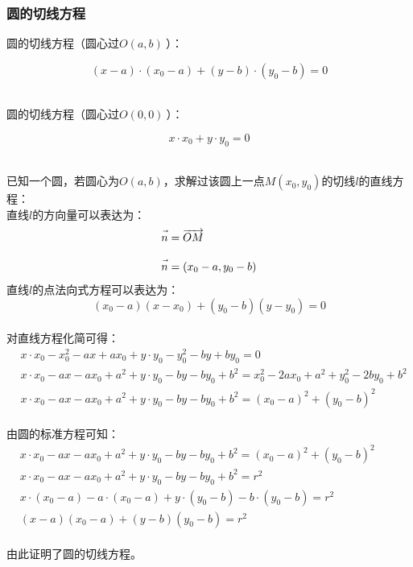 \documentclass[UTF8]{ctexart}
\let\nvec\vec
\def\vec#1{\nvec{\vphantom b\smash{#1}}}
\begin{document}
\subsubsection{圆的切线方程}
    \setcounter{equation}{0}
    圆的切线方程（圆心过$O(a,b)~$）：
    \begin{large}
        \begin{equation}
            (x-a)\cdot(x_0-a)+(y-b)\cdot(y_0-b)=0
        \end{equation}
    \end{large}\\
    圆的切线方程（圆心过$O(0,0)~$）：
    \begin{large}
        \begin{equation}
            x\cdot x_0+y\cdot y_0=0
        \end{equation}
    \end{large}\\
    已知一个圆，若圆心为$O(a,b)$，求解过该圆上一点$M(x_0,y_0)$的切线$l$的直线方程：\\[3mm]
    直线$l$的方向量可以表达为：
    \begin{align}
        &\vec{n}=\overrightarrow{OM}\\[3mm]
        &\vec{n}=(x_0-a,y_0-b)
    \end{align}
    直线$l$的点法向式方程可以表达为：
    \begin{equation}
        (x_0-a)(x-x_0)+(y_0-b)(y-y_0)=0
    \end{equation}\\
    对直线方程化简可得：
    \begin{align}
        &x \cdot x_0-x_0^2-ax+ax_0+y \cdot y_0-y_0^2-by+by_0=0\\[3mm]
        &x \cdot x_0-ax-ax_0+a^2+y \cdot y_0-by-by_0+b^2=x_0^2-2ax_0+a^2+y_0^2-2by_0+b^2\\[3mm]
        &x \cdot x_0-ax-ax_0+a^2+y \cdot y_0-by-by_0+b^2=(x_0-a)^2+(y_0-b)^2
    \end{align}\\
    由圆的标准方程可知：
    \begin{align}
        &x \cdot x_0-ax-ax_0+a^2+y \cdot y_0-by-by_0+b^2=(x_0-a)^2+(y_0-b)^2~~~~~~~~~~~~~~~~~~~\\[3mm]
        &x \cdot x_0-ax-ax_0+a^2+y \cdot y_0-by-by_0+b^2=r^2\\[3mm]
        &x \cdot (x_0-a)-a \cdot (x_0-a)+y \cdot (y_0-b)-b \cdot (y_0-b)=r^2\\[3mm]
        &(x-a)(x_0-a)+(y-b)(y_0-b)=r^2
    \end{align}\\
    由此证明了圆的切线方程。
\end{document}
